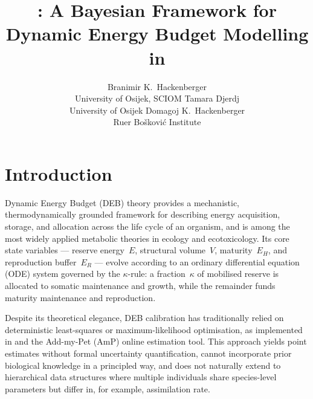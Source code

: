 \documentclass[article,shortnames]{jss}
\author{Branimir K.~Hackenberger\\University of Osijek, SCIOM \And
        Tamara Djerdj\\University of Osijek \And
        Domagoj K.~Hackenberger\\Ru{\dj}er Bo{\v s}kovi{\'c} Institute}
\title{\pkg{BayesianDEB}: A Bayesian Framework for Dynamic Energy
       Budget Modelling in \proglang{R}}
\begin{document}
\section{Introduction} \label{sec:intro}

Dynamic Energy Budget (DEB) theory \citep{Kooijman2010} provides a
mechanistic, thermodynamically grounded framework for describing
energy acquisition, storage, and allocation across the life cycle
of an organism, and is among the most widely applied metabolic
theories in ecology and ecotoxicology.  Its core state variables
--- reserve energy~$E$, structural volume~$V$, maturity~$E_H$, and
reproduction buffer~$E_R$ --- evolve according to an ordinary
differential equation (ODE) system governed by the $\kappa$-rule:
a fraction~$\kappa$ of mobilised reserve is allocated to somatic
maintenance and growth, while the remainder funds maturity maintenance
and reproduction.

Despite its theoretical elegance, DEB calibration has traditionally
relied on deterministic least-squares or maximum-likelihood
optimisation, as implemented in 
\citep{MarquesAmP2018} and the Add-my-Pet (AmP) online estimation
tool.  This approach yields point estimates without formal uncertainty
quantification, cannot incorporate prior biological knowledge in a
principled way, and does not naturally extend to hierarchical data
structures where multiple individuals share species-level parameters
but differ in, for example, assimilation rate.
\end{document}
